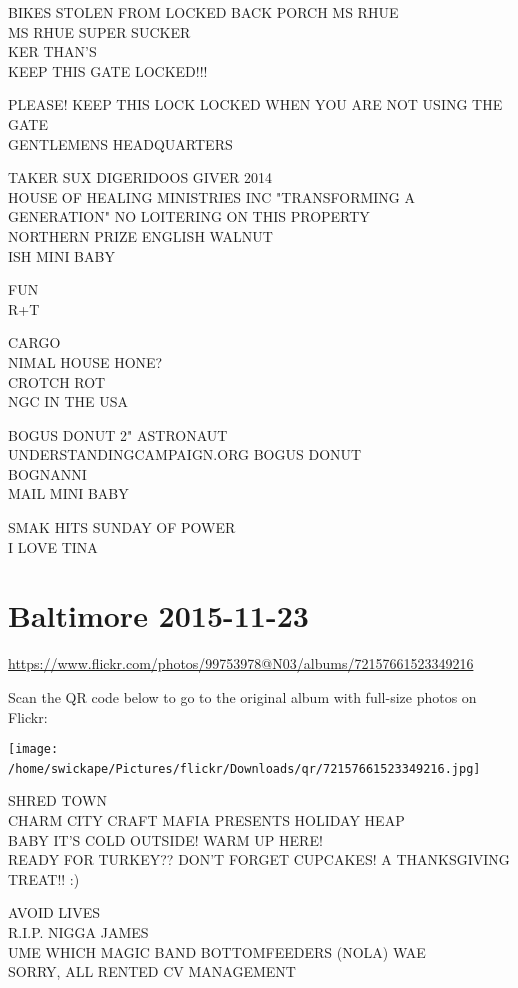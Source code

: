 \documentclass[10pt,letterpaper]{article}
\begin{document}
BIKES STOLEN FROM LOCKED BACK PORCH MS RHUE\\
MS RHUE SUPER SUCKER\\
KER THAN'S\\
KEEP THIS GATE LOCKED!!!

PLEASE!  KEEP THIS LOCK LOCKED WHEN YOU ARE NOT USING THE GATE\\
GENTLEMENS HEADQUARTERS

TAKER SUX DIGERIDOOS GIVER 2014\\
HOUSE OF HEALING MINISTRIES INC "TRANSFORMING A GENERATION" NO LOITERING ON THIS PROPERTY\\
NORTHERN PRIZE ENGLISH WALNUT\\
ISH MINI BABY

FUN\\
R+T

CARGO\\
NIMAL HOUSE HONE?\\
CROTCH ROT\\
NGC IN THE USA

BOGUS DONUT 2" ASTRONAUT\\
UNDERSTANDINGCAMPAIGN.ORG BOGUS DONUT\\
BOGNANNI\\
MAIL MINI BABY

SMAK HITS SUNDAY OF POWER\\
I LOVE TINA
\

\section*{Baltimore 2015-11-23}

\url{https://www.flickr.com/photos/99753978@N03/albums/72157661523349216}

Scan the QR code below to go to the original album with full-size photos on Flickr:

\texttt{[image: /home/swickape/Pictures/flickr/Downloads/qr/72157661523349216.jpg]}
\

SHRED TOWN\\
CHARM CITY CRAFT MAFIA PRESENTS HOLIDAY HEAP\\
BABY IT'S COLD OUTSIDE!  WARM UP HERE!\\
READY FOR TURKEY??  DON'T FORGET CUPCAKES!  A THANKSGIVING TREAT!! :)

AVOID LIVES\\
R.I.P. NIGGA JAMES\\
UME WHICH MAGIC BAND BOTTOMFEEDERS (NOLA) WAE\\
SORRY, ALL RENTED CV MANAGEMENT
\end{document}
